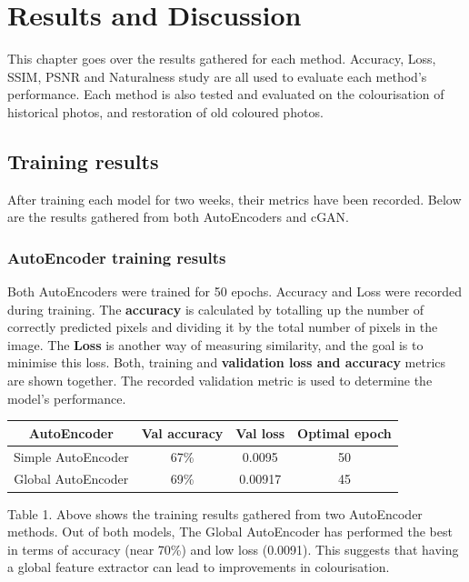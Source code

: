 \chapter{Results and Discussion}
This chapter goes over the results gathered for each method. Accuracy, Loss, SSIM, PSNR and Naturalness study are all used to evaluate each method's performance. Each method is also tested and evaluated on the colourisation of historical photos, and restoration of old coloured photos.
\section{Training results}
After training each model for two weeks, their metrics have been recorded. Below are the results gathered from both AutoEncoders and cGAN.




\subsection{AutoEncoder training results}
Both AutoEncoders were trained for 50 epochs. Accuracy and Loss were recorded during training. The \textbf{accuracy} is calculated by totalling up the number of correctly predicted pixels and dividing it by the total number of pixels in the image. The \textbf{Loss} is another way of measuring similarity, and the goal is to minimise this loss.
Both, training and \textbf{validation loss and accuracy} metrics are shown together. The recorded validation metric is used to determine the model's performance.

\begin{center}
\begin{tabular}{||c c c c||} 
 \hline
  AutoEncoder & Val accuracy & Val loss & Optimal epoch \\ [0.5ex] 
 \hline\hline
 Simple AutoEncoder & 67\% &  0.0095 & 50\\ 
 \hline
 Global AutoEncoder & 69\% & 0.00917 & 45\\
 \hline

\end{tabular}
\end{center}

Table 1. Above shows the training results gathered from two AutoEncoder methods. Out of both models, The Global AutoEncoder has performed the best in terms of accuracy (near 70\%) and low loss (0.0091). This suggests that having a global feature extractor can lead to improvements in colourisation.


